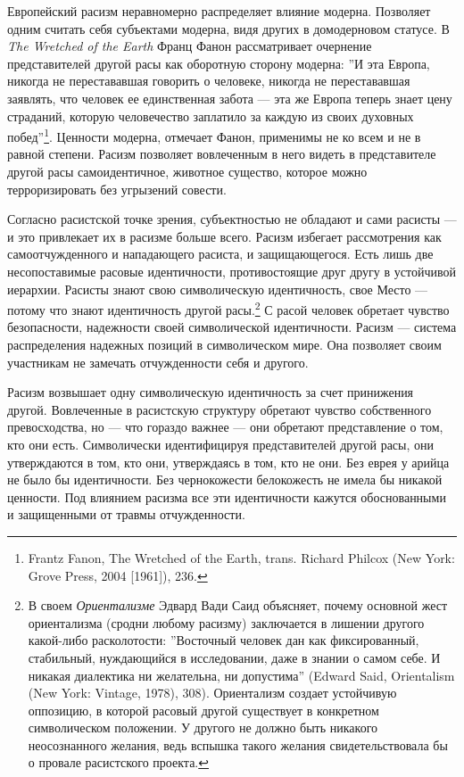 \documentclass[12pt]{book}
\begin{document}
Европейский расизм неравномерно распределяет влияние модерна. Позволяет одним считать себя субъектами модерна, видя других в домодерновом статусе. В \textit{The Wretched of the Earth} Франц Фанон рассматривает очернение представителей другой расы как оборотную сторону модерна: ''И эта Европа, никогда не перестававшая говорить о человеке, никогда не перестававшая заявлять, что человек ее единственная забота --- эта же Европа теперь знает цену страданий, которую человечество заплатило за каждую из своих духовных побед''\footnote{Frantz Fanon, The Wretched of the Earth, trans. Richard Philcox (New York: Grove Press, 2004 [1961]), 236.}. Ценности модерна, отмечает Фанон, применимы не ко всем и не в равной степени. Расизм позволяет вовлеченным в него видеть в представителе другой расы самоидентичное, животное существо, которое можно терроризировать без угрызений совести.

Согласно расистской точке зрения, субъектностью не обладают и сами расисты --- и это привлекает их в расизме больше всего. Расизм избегает рассмотрения как самоотчужденного и нападающего расиста, и защищающегося. Есть лишь две несопоставимые расовые идентичности, противостоящие друг другу в устойчивой иерархии. Расисты знают свою символическую идентичность, свое Место --- потому что знают идентичность другой расы.\footnote{В своем \textit{Ориентализме} Эдвард Вади Саид объясняет, почему основной жест ориентализма (сродни любому расизму) заключается в лишении другого какой-либо расколотости: ''Восточный человек дан как фиксированный, стабильный, нуждающийся в исследовании, даже в знании о самом себе. И никакая диалектика ни желательна, ни допустима'' (Edward Said, Orientalism (New York: Vintage, 1978), 308). Ориентализм создает устойчивую оппозицию, в которой расовый другой существует в конкретном символическом положении. У другого не должно быть никакого неосознанного желания, ведь вспышка такого желания свидетельствовала бы о провале расистского проекта.} С расой человек обретает чувство безопасности, надежности своей символической идентичности. Расизм --- система распределения надежных позиций в символическом мире. Она позволяет своим участникам не замечать отчужденности себя и другого.

Расизм возвышает одну символическую идентичность за счет принижения другой. Вовлеченные в расистскую структуру обретают чувство собственного превосходства, но --- что гораздо важнее --- они обретают представление о том, кто они есть. Символически идентифицируя представителей другой расы, они утверждаются в том, кто они, утверждаясь в том, кто не они. Без еврея у арийца не было бы идентичности. Без чернокожести белокожесть не имела бы никакой ценности. Под влиянием расизма все эти идентичности кажутся обоснованными и защищенными от травмы отчужденности.
\end{document}
